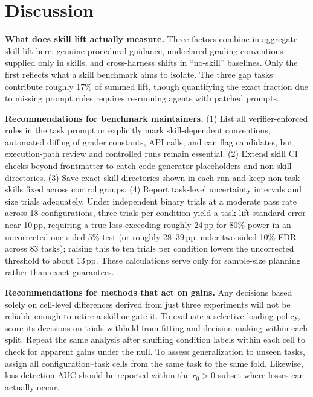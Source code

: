\documentclass[10pt,conference]{IEEEtran}
\newif\ifkeepcuts \keepcutstrue
\newcommand{\cut}[1]{\ifkeepcuts #1\fi}
\begin{document}
\section{Discussion}
\label{sec:discussion}
\textbf{What does skill lift actually measure.} Three factors combine in aggregate skill lift here: genuine procedural guidance, undeclared grading conventions supplied only in skills, and cross-harness shifts in ``no-skill'' baselines. Only the first reflects what a skill benchmark aims to isolate. The three gap tasks contribute roughly 17\% of summed lift, though quantifying the exact fraction due to missing prompt rules requires re-running agents with patched prompts.

\textbf{Recommendations for benchmark maintainers.} (1) List all verifier-enforced rules in the task prompt or explicitly mark skill-dependent conventions; automated diffing of grader constants, API calls, and  can flag candidates, but execution-path review and controlled runs remain essential. (2) Extend skill CI checks beyond frontmatter to catch code-generator placeholders and non-skill directories. (3) Save exact skill directories shown in each run and keep non-task skills fixed across control groups. (4) Report task-level uncertainty intervals and size trials adequately. Under independent binary trials at a moderate pass rate across 18 configurations, three trials per condition yield a task-lift standard error near 10\,pp, requiring a true loss exceeding roughly 24\,pp for 80\% power in an uncorrected one-sided 5\% test (or roughly 28--39\,pp under two-sided 10\% FDR across 83 tasks); raising this to ten trials per condition lowers the uncorrected threshold to about 13\,pp.\cut{ These calculations serve only for sample-size planning rather than exact guarantees.}

\textbf{Recommendations for methods that act on gains.} Any decisions based solely on cell-level differences derived from just three experiments will not be reliable enough to retire a skill or gate it. To evaluate a selective-loading policy, score its decisions on trials withheld from fitting and decision-making within each split. Repeat the same analysis after shuffling condition labels within each cell to check for apparent gains under the null. To assess generalization to unseen tasks, assign all configuration--task cells from the same task to the same fold. Likewise, loss-detection AUC should be reported within the $r_{0}>0$ subset where losses can actually occur.
\end{document}
